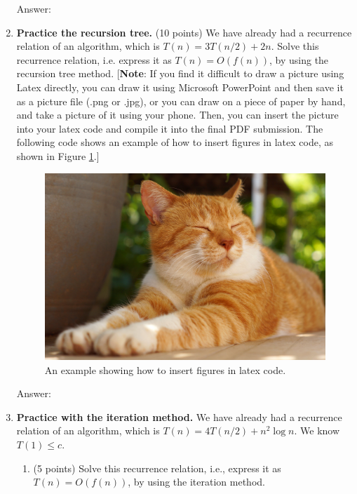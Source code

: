\documentclass[12pt]{article}
\begin{document}
\begin{enumerate}
    {\color{blue}Answer: }

  \item \textbf{Practice the recursion tree.} (10 points) We have already had a recurrence relation of an algorithm, which is $T(n) = 3 T(n/2) + 2n$. Solve this recurrence relation, i.e. express it as $T(n) = O(f(n))$, by using the recursion tree method. [\textbf{Note}: If you find it difficult to draw a picture using Latex directly, you can draw it using Microsoft PowerPoint and then save it as a picture file (.png or .jpg), or you can draw on a piece of paper by hand, and take a picture of it using your phone. Then, you can insert the picture into your latex code and compile it into the final PDF submission. The following code shows an example of how to insert figures in latex code, as shown in Figure \ref{fig:example}.]
  
  \begin{figure}[h]
  	\centering
  	\includegraphics*[scale=0.1]{example_image.jpg}
	\caption{An example showing how to insert figures in latex code.}
	\label{fig:example}
  \end{figure}
  
  {\color{blue}Answer: }
  
  \item \textbf{Practice with the iteration method.} We have already had a recurrence relation of an algorithm, which is $T(n) = 4 T(n/2) + n^2 \log n$. We know $T(1) \le c$.
  \begin{enumerate}
  
  \item (5 points) Solve this recurrence relation, i.e., express it as $T(n) = O(f(n))$, by using the iteration method.


\end{enumerate}
\end{enumerate}
\end{document}
